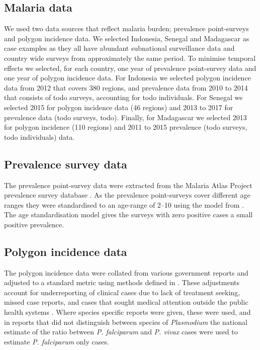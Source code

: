 \documentclass[10pt,letterpaper]{article}
\begin{document}
\subsection*{Malaria data}

We used two data sources that reflect malaria burden; prevalence point-surveys and polygon incidence data.
We selected Indonesia, Senegal and Madagascar as case examples as they all have abundant subnational surveillance data and country wide surveys from approximately the same period.
To minimise temporal effects we selected, for each country, one year of prevalence point-survey data and one year of polygon incidence data.
For Indonesia we selected polygon incidence data from 2012 that covers 380 regions, and prevalence data from 2010 to 2014 that consists of todo surveys, accounting for todo individuals.
For Senegal we selected 2015 for polygon incidence data (46 regions) and 2013 to 2017 for prevalence data (todo surveys, todo).
Finally, for Madagascar we selected 2013 for polygon incidence (110 regions) and 2011 to 2015 prevalence (todo surveys, todo individuals) data.



\subsection*{Prevalence survey data}

The prevalence point-survey data were extracted from the Malaria Atlas Project prevalence survey database \cite{bhatt2015effect, guerra2007assembling, gething2011new, pfeffer2018ma}.
As the prevalence point-surveys cover different age ranges they were standardised to an age-range of 2--10 using the model from \cite{smith2007standardizing}.
The age standardisation model gives the surveys with zero positive cases a small positive prevalence.

\subsection*{Polygon incidence data}


The polygon incidence data were collated from various government reports and adjusted to a standard metric using methods defined in \cite{cibulskis2011worldwide}.
These adjustments account for underreporting of clinical cases due to lack of treatment seeking, missed case reports, and cases that sought medical attention outside the public health systems \cite{battle2016treatment}.
Where species specific reports were given, these were used, and in reports that did not distinguish between species of \emph{Plasmodium} the national estimate of the ratio between \emph{P. falciparum} and \emph{P. vivax} cases were used to estimate \emph{P. falciparum} only cases.
\end{document}
